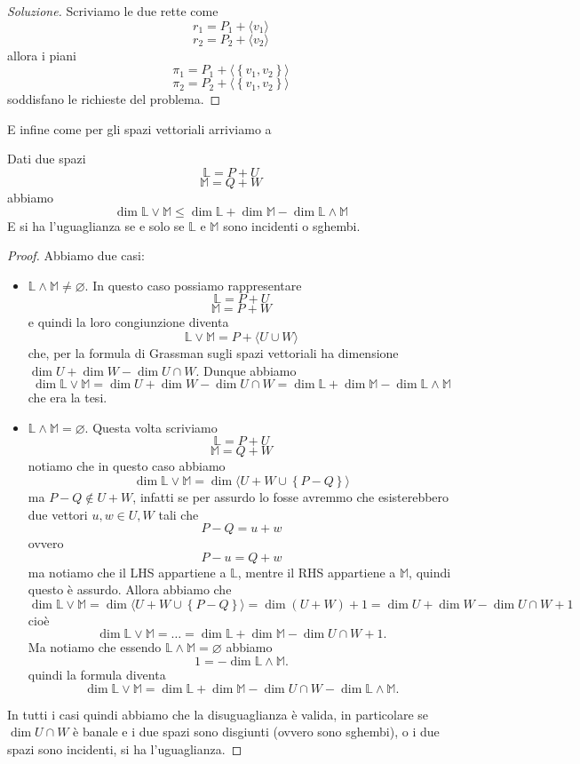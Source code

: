 \documentclass[11pt]{scrartcl}
\newcommand{\eset}{\varnothing}
\begin{document}
   	 \begin{proof}[Soluzione]
   	 	Scriviamo le due rette come
   	 	$$r_1=P_1+\langle v_1 \rangle$$
   	 	$$r_2=P_2+\langle v_2 \rangle$$
   	 	allora i piani 
   	 	$$\pi_1=P_1+\langle\left\{ v_1,v_2\right\}\rangle$$
   	 	$$\pi_2=P_2+\langle \left\{v_1,v_2\right\}\rangle$$
   	 	soddisfano le richieste del problema.
   	 \end{proof}
   	 E infine come per gli spazi vettoriali arriviamo a
   	 \begin{theorem}
   	 	Dati due spazi
   	 	$$\mathbb{L}=P+U$$
   	 	$$\mathbb{M}=Q+W$$
   	 	abbiamo
   	 	$$\dim\mathbb{L}\lor \mathbb{M}\le\dim\mathbb{L}+\dim\mathbb{M}-\dim\mathbb{L}\land\mathbb{M}$$
   	 	E si ha l'uguaglianza se e solo se $\mathbb{L}$ e $\mathbb{M}$ sono incidenti o sghembi.
   	 \end{theorem}
   	 \begin{proof}
   	 	Abbiamo due casi:
   	 	\begin{itemize}
   	 		\item $\mathbb{L}\land\mathbb{M}\ne \eset$. In questo caso possiamo rappresentare
   	 		$$\mathbb{L}=P+U$$
   	 		$$\mathbb{M}=P+W$$
   	 		e quindi la loro congiunzione diventa
   	 		$$\mathbb{L}\lor \mathbb{M}=P+\langle U\cup W \rangle$$
   	 		che, per la formula di Grassman sugli spazi vettoriali ha dimensione $\dim U + \dim W - \dim U\cap W$. Dunque
   	 		abbiamo
   	 		$$\dim \mathbb{L}\lor \mathbb{M} = \dim U + \dim W - \dim U\cap W =\dim \mathbb{L}+\dim\mathbb{M}-\dim\mathbb{L}\land \mathbb{M}$$
   	 		che era la tesi. 
   	 		\item $\mathbb{L}\land \mathbb{M}=\eset$. Questa volta scriviamo
   	 		$$\mathbb{L}=P+U$$
   	 		$$\mathbb{M}=Q+W$$
   	 		notiamo che in questo caso abbiamo
   	 		$$\dim \mathbb{L}\lor \mathbb{M}=\dim \langle U+W\cup \left\{P-Q\right\}\rangle$$
   	 		ma $P-Q\not \in U+W$, infatti se per assurdo lo fosse avremmo che esisterebbero due vettori $u,w\in U,W$ tali che
   	 		$$P-Q=u+w$$
   	 		ovvero
   	 		$$P-u=Q+w$$
   	 		ma notiamo che il LHS appartiene a $\mathbb{L}$, mentre il RHS appartiene a $\mathbb{M}$, quindi questo è assurdo. Allora abbiamo che 
   	 		$$\dim\mathbb{L}\lor \mathbb{M}=\dim\langle U+W\cup\left\{P-Q\right\}\rangle=\dim(U+W)+1=\dim U + \dim W - \dim U\cap W +1$$
   	 		cioè
   	 		$$\dim\mathbb{L}\lor \mathbb{M}=\dots=\dim\mathbb{L}+\dim\mathbb{M}-\dim U\cap W +1.$$
   	 		Ma notiamo che essendo $\mathbb{L}\land \mathbb{M}=\eset $ abbiamo
   	 		$$1=-\dim\mathbb{L}\land \mathbb{M}.$$ 
   	 		quindi la formula diventa
   	 		$$\dim\mathbb{L}\lor \mathbb{M}=\dim\mathbb{L}+\dim\mathbb{M}-\dim U\cap W -\dim\mathbb{L}\land \mathbb{M}.$$
   	 	\end{itemize}
   	 	In tutti i casi quindi abbiamo che la disuguaglianza è valida, in particolare se $\dim U\cap W$ è banale e i due spazi sono disgiunti (ovvero sono sghembi), o i due spazi sono incidenti, si ha l'uguaglianza.
   	 \end{proof}
\end{document}
